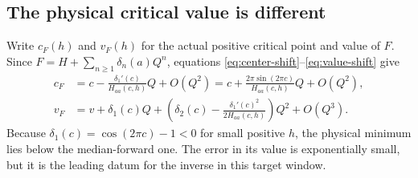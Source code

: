 \documentclass[11pt,a4paper]{article}
\numberwithin{equation}{section}
\theoremstyle{definition}
\theoremstyle{remark}\newtheorem{remark}[theorem]{Remark}
\begin{document}
\subsection{The physical critical value is different}
Write $c_F(h)$ and $v_F(h)$ for the actual positive critical point and
value of $F$. Since
$F=H+\sum_{n\ge1}\delta_n(a)Q^n$, equations
\eqref{eq:center-shift}--\eqref{eq:value-shift} give
\begin{align}
 c_F&=c-\frac{\delta_1'(c)}{H_{aa}(c,h)}Q+O(Q^2)
     =c+\frac{2\pi\sin(2\pi c)}{H_{aa}(c,h)}Q+O(Q^2),
                     \label{eq:qcriticalpoint}\\
 v_F&=v+\delta_1(c)Q+
 \left(\delta_2(c)-\frac{\delta_1'(c)^2}{2H_{aa}(c,h)}\right)Q^2
      +O(Q^3).\label{eq:qcriticalvalue}
\end{align}
Because $\delta_1(c)=\cos(2\pi c)-1<0$ for small positive $h$,
the physical minimum lies below the median-forward one. The error in
its value is exponentially small, but it is the leading datum for the
inverse in this target window.
\end{document}
